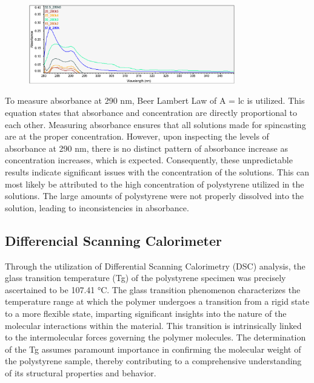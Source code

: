 \documentclass[twocolumn]{article}
\begin{document}
                \begin{figure}
                    \centering
                    \includegraphics[width=0.8\textwidth]{img/uvvis.png}
                    \label{fig:uv-vis}
                \end{figure}
                To measure absorbance at 290 nm, Beer Lambert Law of A = lc is utilized. This equation states that absorbance and concentration are directly proportional to each other. Measuring absorbance ensures that all solutions made for spincasting are at the proper concentration. However, upon inspecting the levels of absorbance at 290 nm, there is no distinct pattern of absorbance increase as concentration increases, which is expected. Consequently, these unpredictable results indicate significant issues with the concentration of the solutions. This can most likely be attributed to the high concentration of polystyrene utilized in the solutions. The large amounts of  polystyrene were not properly dissolved into the solution, leading to inconsistencies in absorbance. 

            \subsection{Differencial Scanning Calorimeter}
                Through the utilization of Differential Scanning Calorimetry (DSC) analysis, the glass transition temperature (Tg) of the polystyrene specimen was precisely ascertained to be 107.41 °C. The glass transition phenomenon characterizes the temperature range at which the polymer undergoes a transition from a rigid state to a more flexible state, imparting significant insights into the nature of the molecular interactions within the material. This transition is intrinsically linked to the intermolecular forces governing the polymer molecules\autocite{WOS:COUCHMAN}. The determination of the Tg assumes paramount importance in confirming the molecular weight of the polystyrene sample, thereby contributing to a comprehensive understanding of its structural properties and behavior.
\end{document}
